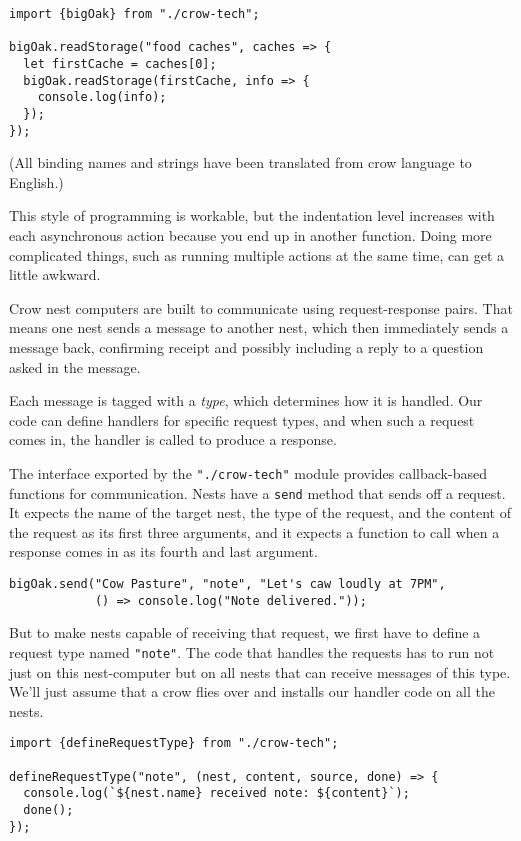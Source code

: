\begin{lstlisting}
import {bigOak} from "./crow-tech";

bigOak.readStorage("food caches", caches => {
  let firstCache = caches[0];
  bigOak.readStorage(firstCache, info => {
    console.log(info);
  });
});
\end{lstlisting}
\noindent

(All binding names and strings have been translated from crow language to English.)

This style of programming is workable, but the indentation level increases with each asynchronous action because you end up in another function. Doing more complicated things, such as running multiple actions at the same time, can get a little awkward.

Crow nest computers are built to communicate using request-response pairs. That means one nest sends a message to another nest, which then immediately sends a message back, confirming receipt and possibly including a reply to a question asked in the message.

Each message is tagged with a \emph{type}, which determines how it is handled. Our code can define handlers for specific request types, and when such a request comes in, the handler is called to produce a response.

The interface exported by the \lstinline`"./crow-tech"` module provides callback-based functions for communication. Nests have a \lstinline`send` method that sends off a request. It expects the name of the target nest, the type of the request, and the content of the request as its first three arguments, and it expects a function to call when a response comes in as its fourth and last argument.

\begin{lstlisting}
bigOak.send("Cow Pasture", "note", "Let's caw loudly at 7PM",
            () => console.log("Note delivered."));
\end{lstlisting}
\noindent

But to make nests capable of receiving that request, we first have to define a request type named \lstinline`"note"`. The code that handles the requests has to run not just on this nest-computer but on all nests that can receive messages of this type. We'll just assume that a crow flies over and installs our handler code on all the nests.

\begin{lstlisting}
import {defineRequestType} from "./crow-tech";

defineRequestType("note", (nest, content, source, done) => {
  console.log(`${nest.name} received note: ${content}`);
  done();
});
\end{lstlisting}
\noindent

